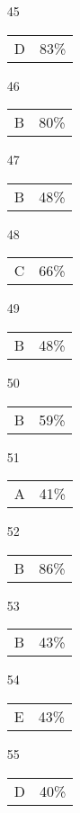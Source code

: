 \documentclass{article}
\begin{document}
\begin{multicols}{4}
\begin{enumerate}
    \item[45] \begin{tabular}{cc} D & 83\%\end{tabular}
    
       \item[]
    
    \item[46] \begin{tabular}{cc} B & 80\%\end{tabular}
    
    \item[47] \begin{tabular}{cc} B & 48\%\end{tabular}
    
    \item[48] \begin{tabular}{cc} C & 66\%\end{tabular}
    
    \item[49] \begin{tabular}{cc} B & 48\%\end{tabular}
    
    \item[50] \begin{tabular}{cc} B & 59\%\end{tabular}
    
       \item[]
    
    \item[51] \begin{tabular}{cc} A & 41\%\end{tabular}
    
    \item[52] \begin{tabular}{cc} B & 86\%\end{tabular}
    
    \item[53] \begin{tabular}{cc} B & 43\%\end{tabular}
    
    \item[54] \begin{tabular}{cc} E & 43\%\end{tabular}
    
    \item[55] \begin{tabular}{cc} D & 40\%\end{tabular}
    

\end{enumerate}
\end{multicols}
\end{document}
